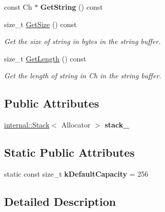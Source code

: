 \begin{DoxyCompactItemize}
\item 
const Ch $\ast$ {\bfseries Get\+String} () const \hypertarget{a00127_a42ed917a29012d932802f2709e11c572}{}\label{a00127_a42ed917a29012d932802f2709e11c572}

\item 
size\+\_\+t \hyperlink{a00127_abd04725d776322157be3381f5559c40b}{Get\+Size} () const \hypertarget{a00127_abd04725d776322157be3381f5559c40b}{}\label{a00127_abd04725d776322157be3381f5559c40b}

\begin{DoxyCompactList}\small\item\em Get the size of string in bytes in the string buffer. \end{DoxyCompactList}\item 
size\+\_\+t \hyperlink{a00127_a8ad04ebc2bbe46a116613d1ed0d1eeff}{Get\+Length} () const \hypertarget{a00127_a8ad04ebc2bbe46a116613d1ed0d1eeff}{}\label{a00127_a8ad04ebc2bbe46a116613d1ed0d1eeff}

\begin{DoxyCompactList}\small\item\em Get the length of string in Ch in the string buffer. \end{DoxyCompactList}\end{DoxyCompactItemize}
\subsection*{Public Attributes}
\begin{DoxyCompactItemize}
\item 
\hyperlink{a00283}{internal\+::\+Stack}$<$ Allocator $>$ {\bfseries stack\+\_\+}\hypertarget{a00127_aaef716643febb9de5957dbf8ff904409}{}\label{a00127_aaef716643febb9de5957dbf8ff904409}

\end{DoxyCompactItemize}
\subsection*{Static Public Attributes}
\begin{DoxyCompactItemize}
\item 
static const size\+\_\+t {\bfseries k\+Default\+Capacity} = 256\hypertarget{a00127_ae74f9df854dd5a7db4315ef44b016d22}{}\label{a00127_ae74f9df854dd5a7db4315ef44b016d22}

\end{DoxyCompactItemize}


\subsection{Detailed Description}
